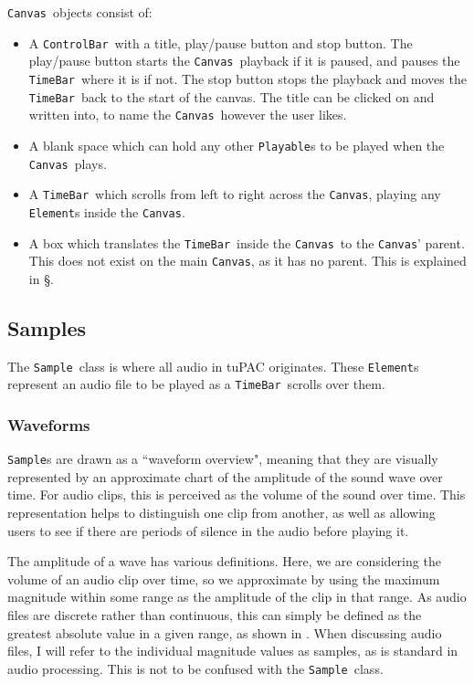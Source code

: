 \documentclass[12pt,a4paper,twoside,openright]{report}
\newcommand{\element}{\texttt{Element}}
\newcommand{\canvas}{\texttt{Canvas}}
\newcommand{\controlbar}{\texttt{ControlBar}}
\newcommand{\timebar}{\texttt{TimeBar}}
\newcommand{\playable}{\texttt{Playable}}
\newcommand{\sample}{\texttt{Sample}}
\begin{document}
\canvas\ objects consist of:
\begin{itemize}
    \item A \controlbar\ with a title, play/pause button and stop button. The play/pause button starts the \canvas\ playback if it is paused, and pauses the \timebar\ where it is if not. The stop button stops the playback and moves the \timebar\ back to the start of the canvas. The title can be clicked on and written into, to name the \canvas\ however the user likes.
    \item A blank space which can hold any other \playable s to be played when the \canvas\ plays.
    \item A \timebar\ which scrolls from left to right across the \canvas, playing any \element s inside the \canvas.
    \item A box which translates the \timebar\ inside the \canvas\ to the \canvas' parent. This does not exist on the main \canvas, as it has no parent. This is explained in \S{}.
\end{itemize}

\subsection{Samples}
The \sample\ class is where all audio in tuPAC originates. These \element s represent an audio file to be played as a \timebar\ scrolls over them.

\subsubsection{Waveforms}
\sample s are drawn as a ``waveform overview", meaning that they are visually represented by an approximate chart of the amplitude of the sound wave over time. For audio clips, this is perceived as the volume of the sound over time. This representation helps to distinguish one clip from another, as well as allowing users to see if there are periods of silence in the audio before playing it.

The amplitude of a wave has various definitions. Here, we are considering the volume of an audio clip over time, so we approximate by using the maximum magnitude within some range as the amplitude of the clip in that range. As audio files are discrete rather than continuous, this can simply be defined as the greatest absolute value in a given range, as shown in . When discussing audio files, I will refer to the individual magnitude values as samples, as is standard in audio processing. This is not to be confused with the \sample\ class.
\end{document}
